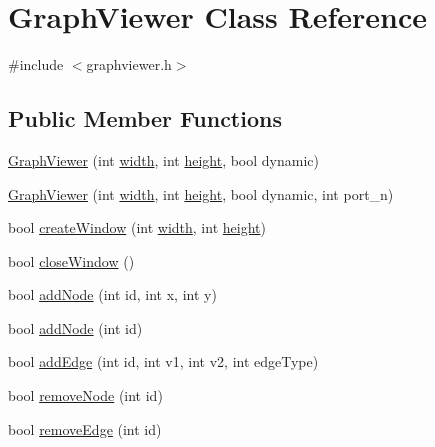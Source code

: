 \hypertarget{class_graph_viewer}{}\section{Graph\+Viewer Class Reference}
\label{class_graph_viewer}


{\ttfamily \#include $<$graphviewer.\+h$>$}

\subsection*{Public Member Functions}
\begin{DoxyCompactItemize}
\item 
\mbox{\hyperlink{class_graph_viewer_a8adc614f4fc290a3efcec7d7ceb1c58a}{Graph\+Viewer}} (int \mbox{\hyperlink{class_graph_viewer_a5de27a1d20968b8494cd4bf5a4eb27e1}{width}}, int \mbox{\hyperlink{class_graph_viewer_a9a1000e492a66ac4301c7135275690da}{height}}, bool dynamic)
\item 
\mbox{\hyperlink{class_graph_viewer_ad9d7b1d8b4ba8ef18517eae0e68568a2}{Graph\+Viewer}} (int \mbox{\hyperlink{class_graph_viewer_a5de27a1d20968b8494cd4bf5a4eb27e1}{width}}, int \mbox{\hyperlink{class_graph_viewer_a9a1000e492a66ac4301c7135275690da}{height}}, bool dynamic, int port\+\_\+n)
\item 
bool \mbox{\hyperlink{class_graph_viewer_ae5247dc66449dcd21fc5d531bbbaddfa}{create\+Window}} (int \mbox{\hyperlink{class_graph_viewer_a5de27a1d20968b8494cd4bf5a4eb27e1}{width}}, int \mbox{\hyperlink{class_graph_viewer_a9a1000e492a66ac4301c7135275690da}{height}})
\item 
bool \mbox{\hyperlink{class_graph_viewer_a85990c1eaac7feed3950960d4bd2fd4c}{close\+Window}} ()
\item 
bool \mbox{\hyperlink{class_graph_viewer_a5421e86ac76433876309236ba96e70a2}{add\+Node}} (int id, int x, int y)
\item 
bool \mbox{\hyperlink{class_graph_viewer_ab9be856eb5f45284719a3bb119ec01ea}{add\+Node}} (int id)
\item 
bool \mbox{\hyperlink{class_graph_viewer_aad0c1448c37f744209ffb671f1bd0015}{add\+Edge}} (int id, int v1, int v2, int edge\+Type)
\item 
bool \mbox{\hyperlink{class_graph_viewer_a0c418639bb911eb827cabf895915f775}{remove\+Node}} (int id)
\item 
bool \mbox{\hyperlink{class_graph_viewer_a9a8ee68c7c12b373affbe4069dd95d72}{remove\+Edge}} (int id)
\item 

\end{DoxyCompactItemize}
